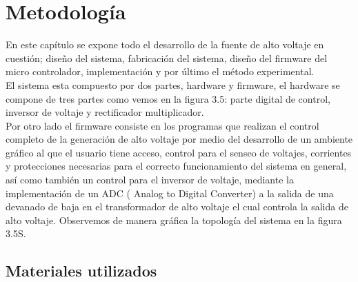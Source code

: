 



\chapter{Metodología}
En este capítulo se expone todo el desarrollo de la fuente de alto voltaje en cuestión; diseño del sistema, fabricación del sistema, diseño del firmware del micro controlador, implementación y por último el método experimental.\\

El sistema esta compuesto por dos partes, hardware y firmware, el hardware se compone de tres partes como vemos en la figura 3.5: parte digital de control, inversor de voltaje y rectificador multiplicador. \\

Por otro lado el firmware consiste en los programas que realizan el control completo de la generación de alto voltaje por medio del desarrollo de un ambiente gráfico al que el usuario tiene acceso,  control para el senseo de voltajes, corrientes y protecciones necesarias para el correcto funcionamiento del sistema en general, así como también un control para el inversor de voltaje, mediante la implementación de un ADC ( Analog to Digital Converter) a la salida de una devanado de baja en el transformador de alto voltaje el cual controla la salida de alto voltaje. Observemos de manera gráfica la topología del sistema en la figura 3.5S. 
\newpage





\section{Materiales utilizados}

